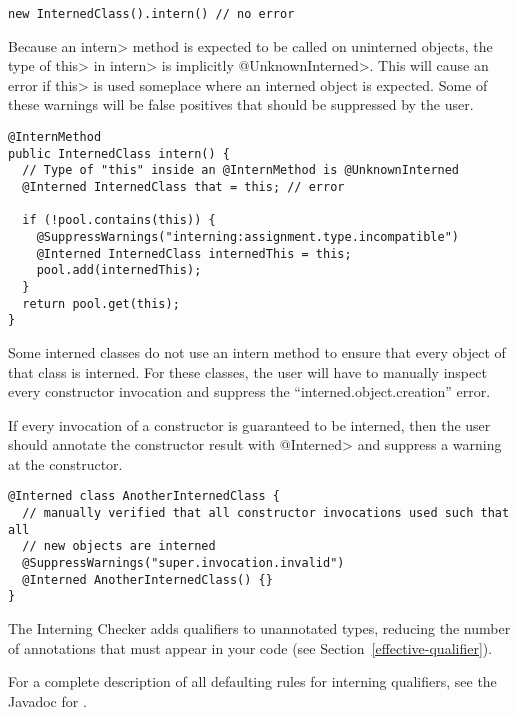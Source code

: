 \begin{Verbatim}
new InternedClass().intern() // no error
\end{Verbatim}

Because an \<intern> method is expected to be called on uninterned objects, the
type of \<this> in \<intern> is implicitly \<@UnknownInterned>. This will cause an
error if \<this> is used someplace where an interned object is expected.  Some
of these warnings will be false positives that should be suppressed by the
user.

\begin{Verbatim}
@InternMethod
public InternedClass intern() {
  // Type of "this" inside an @InternMethod is @UnknownInterned
  @Interned InternedClass that = this; // error

  if (!pool.contains(this)) {
    @SuppressWarnings("interning:assignment.type.incompatible")
    @Interned InternedClass internedThis = this;
    pool.add(internedThis);
  }
  return pool.get(this);
}
\end{Verbatim}

Some interned classes do not use an intern method to ensure that every object
of that class is interned.  For these classes, the user will have to manually
inspect every constructor invocation and suppress the ``interned.object.creation''
error.

If every invocation of a constructor is guaranteed to be interned, then the
user should annotate the constructor result with \<@Interned> and suppress a
warning at the constructor.

\begin{Verbatim}
@Interned class AnotherInternedClass {
  // manually verified that all constructor invocations used such that all
  // new objects are interned
  @SuppressWarnings("super.invocation.invalid")
  @Interned AnotherInternedClass() {}
}
\end{Verbatim}



The Interning Checker
adds qualifiers to unannotated types, reducing the number of annotations that must
appear in your code (see Section~\ref{effective-qualifier}).

For a complete description of all defaulting rules for interning qualifiers, see the
Javadoc for .


